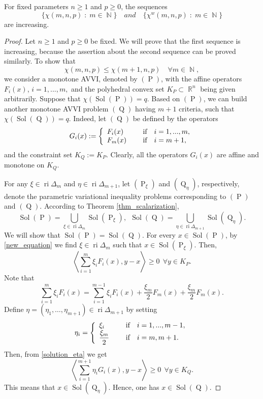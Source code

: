 \documentclass[smallextended,envcountsect]{svjour3}       %
\DeclareMathOperator{\Sol}{Sol}
\DeclareMathOperator{\Pa}{P}
\DeclareMathOperator{\Q}{Q}
\DeclareMathOperator{\ri}{ri}
\DeclareMathOperator{\N}{\mathbb{N}}
\DeclareMathOperator{\R}{\mathbb{R}}
\begin{document}
\begin{proposition}\label{nondecreasingm}  For fixed parameters $n\geq 1$ and $p\geq 0$, the sequences $$\{\chi(m,n,p)\;:\;m\in \N\}\quad {and}\quad \{\chi^w(m,n,p)\;:\;m\in \N\}$$ are increasing. 
\end{proposition}
\begin{proof}  Let  $n\geq 1$ and $p\geq 0$ be fixed. We will prove that the first sequence is increasing, because the assertion about the second sequence can be proved similarly. To show that $$\chi(m,n,p) \leq\chi(m+1,n,p)\quad \forall m\in \N,$$
we consider a monotone AVVI, denoted by $(\Pa)$, with the affine operators $F_i(x)$, $ i=1,...,m,$ and the polyhedral convex set $K_P\subset \R^n$ being given arbitrarily. Suppose that $\chi(\Sol(\Pa))=q$. Based on $(\Pa)$, we can build another monotone AVVI problem $(\Q)$ having $m+1$ criteria, such that $\chi(\Sol(\Q))=q$. Indeed, let $(\Q)$ be defined by the operators
\begin{equation}\label{solution_eta0}
G_i(x):=\left\{\begin{array}{ll}
F_i(x)& \quad \hbox{ if } \ \ i=1,...,m,  \\
F_{m}(x) & \quad \hbox{ if } \ \ i=m+1,  \\
\end{array}\right.
\end{equation}
and the constraint set $K_Q:=K_P$. Clearly, all the operators $G_i(x)$ are affine and monotone on $K_Q$.
	
For any $\xi \in \ri\Delta_m$ and $\eta\in \ri\Delta_{m+1}$, let  $(\Pa_{\xi})$ and $(\Q_{\eta})$, respectively, denote the parametric variational inequality problems corresponding to  $(\Pa)$ and $(\Q)$. According to Theorem \ref{thm_scalarization}, 
	\begin{equation}\label{new_equation}
	\Sol(\Pa)=\bigcup_{\xi\in\ri\Delta_m}\Sol(\Pa_\xi), \ \ \Sol(\Q)=\bigcup_{\eta\in\ri\Delta_{m+1}}\Sol(\Q_{\eta}).
	\end{equation}
We will show that $\Sol(\Pa)=\Sol(\Q)$. For every $x\in\Sol(\Pa)$, by \eqref{new_equation} we find $\xi\in \ri\Delta_m$ such that $x\in \Sol(\Pa_{\xi})$. Then,
\begin{equation}\label{solution_eta}
\left\langle  \sum_{i=1}^m\xi_iF_i(x),y-x \right\rangle \geq 0  \ \ \forall y\in K_P.
\end{equation}
Note that
	$$\sum_{i=1}^m\xi_iF_i(x)=\sum_{i=1}^{m-1}\xi_iF_i(x)+\frac{\xi_m}{2}F_m(x)+\frac{\xi_m}{2}F_m(x).$$
Define $\eta=(\eta_1,\dots,\eta_{m+1})\in \ri\Delta_{m+1}$ by setting
$$\eta_i=\left\{\begin{array}{ll}
\xi_i& \quad \hbox{ if } \ \ i=1,...,m-1,  \\
\dfrac{\xi_m}{2}& \quad \hbox{ if } \ \ i=m,m+1.  \\
\end{array}\right.$$
Then, from \eqref{solution_eta} we get
$$\left\langle  \sum_{i=1}^{m+1}\eta_iG_i(x),y-x \right\rangle \geq 0  \ \ \forall y\in K_Q.$$
This means that $x\in \Sol(\Q_{\eta})$. Hence, one has $x\in \Sol(\Q)$. 


\end{proof}
\end{document}
